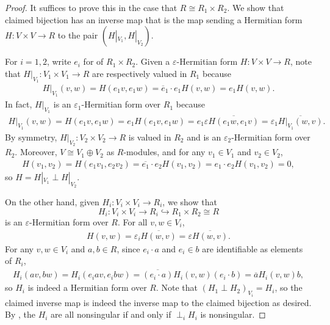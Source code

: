 \begin{proof}
    It suffices to prove this in the case that $R \cong R_1 \times R_2$. We show that claimed bijection has an inverse map that is the map sending a Hermitian form $H: V \times V \to R$ to the pair $(H|_{V_1}, H|_{V_2})$.

    For $i = 1,2$, write $e_i$ for  of $R_1 \times R_2$.
    Given a $\varepsilon$-Hermitian form $H: V \times V \to R$, note that $H|_{V_1}: V_1 \times V_1 \to R$ are respectively valued in $R_1$ because 
        \begin{align*}
        H|_{V_1}(v,w) = H(e_1 v, e_1 w) = \overline{e}_1 \cdot e_1 H(v, w) = e_1 H(v,w).
        \end{align*}
    In fact, $H|_{V_1}$ is an $\varepsilon_1$-Hermitian form over $R_1$ because
        \begin{align*}
            H|_{V_1}(v,w) = H(e_1 v, e_1 w) = e_1 H(e_1 v,e_1 w) = e_1 \varepsilon \overline{H(e_1 w, e_1 v)} = \varepsilon_1 \overline{H|_{V_1}(w,v)}.
        \end{align*}
    By symmetry, $H|_{V_2}: V_2 \times V_2 \to R$ is valued in $R_2$ and is an $\varepsilon_2$-Hermitian form over $R_2$. Moreover, $V \cong V_1 \oplus V_2$ as $R$-modules, and for any $v_1 \in V_1$ and $v_2 \in V_2$, 
        \begin{align*}
        H(v_1, v_2) = H(e_1 v_1, e_2 v_2) = \overline{e_1 } \cdot e_2 H(v_1, v_2) = e_1 \cdot e_2 H(v_1,v_2) = 0,
        \end{align*}
    so $H = H|_{V_1} \perp H|_{V_2}$.
    
    On the other hand, given $H_i: V_i \times V_i \to R_i$, we show that 
    $$H_i: V_i \times V_i \to R_i \hookrightarrow R_1 \times R_2 \cong R$$ 
    is an $\varepsilon$-Hermitian form over $R$. For all $v,w \in V_i$, 
        \begin{align*}
            H(v,w) = \varepsilon_i \overline{H(w,v)} = \varepsilon \overline{H(w,v)}.
        \end{align*}
    For any $v,w \in V_i$ and $a,b \in R$, since $e_i \cdot a$ and $e_i \in b$ are identifiable as elements of $R_i$,
        \begin{align*}
        H_i(av, bw) = H_i(e_i a v, e_i b w) = \overline{(e_i \cdot a)} H_i(v, w) (e_i \cdot b) = \overline{a} H_i(v,w) b,
        \end{align*}
    so $H_i$ is indeed a Hermitian form over $R$. Note that $(H_1 \perp H_2)_{V_i} = H_i$, so the claimed inverse map is indeed the inverse map to the claimed bijection as desired. By , the $H_i$ are all nonsingular if and only if $\perp_i H_i$ is nonsingular.
\end{proof}
